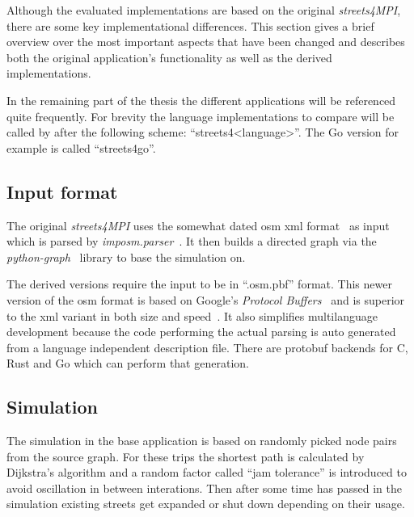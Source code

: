 Although the evaluated implementations are based on the original \textit{streets4MPI}, there are some key implementational differences. This section gives a brief overview over the most important aspects that have been changed and describes both the original application's functionality as well as the derived implementations.

In the remaining part of the thesis the different applications will be referenced quite frequently. For brevity the language implementations to compare will be called by after the following scheme: ``streets4<language>''. The Go version for example is called ``streets4go''.

\subsection*{Input format}
\label{subsec:Approach::Differences::Input}

The original \textit{streets4MPI} uses the somewhat dated \gls{osm} \gls{xml} format~ as input which is parsed by \textit{imposm.parser}~. It then builds a directed graph via the \textit{python-graph}~ library to base the simulation on.\cite{streets_report}

The derived versions require the input to be in ``.osm.pbf'' format. This newer version of the \gls{osm} format is based on Google's \textit{Protocol Buffers}~ and is superior to the \gls{xml} variant in both size and speed~\cite{osm_wiki_pbf}. It also simplifies multilanguage development because the code performing the actual parsing is auto generated from a language independent description file. There are protobuf backends for C, Rust and Go which can perform that generation.

\subsection*{Simulation}
\label{subsec:Approach::Differences::Simulation}

The simulation in the base application is based on randomly picked node pairs from the source graph. For these trips the shortest path is calculated by Dijkstra's algorithm\cite{streets_report} and a random factor called ``jam tolerance'' is introduced to avoid oscillation in between interations. Then after some time has passed in the simulation existing streets get expanded or shut down depending on their usage.

